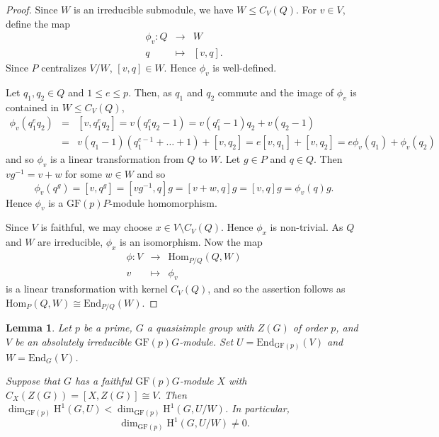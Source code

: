 \documentclass[12pt]{amsart}
\newtheorem{lemma}[theorem]{Lemma}
\theoremstyle{remark}
\theoremstyle{notation}
\theoremstyle{definition}
\newcommand{\GF}{\mathrm{GF}}
\newcommand{\0}{\emptyset}
\begin{document}
\begin{proof} Since $W$ is an irreducible submodule, we   have $W \le C_V(Q)$.
 For $v \in V$, define the map \begin{eqnarray*}\phi_{ v}:Q &\rightarrow& W\\ q &\mapsto& [v,q].\end{eqnarray*}  Since   $P$ centralizes $V/W$, $[v,q]\in W$. Hence $\phi_{ v}$  is well-defined.

Let $q_1,q_2\in Q$ and $1\le e\le p$.  Then, as $q_1$ and $q_2$ commute and the image of $\phi_{  v }$ is contained in $W\le C_V(Q)$,  \begin{eqnarray*}\phi_v(q_1^eq_2)&=&[v,q_1^eq_2]= v(q_1^eq_2-1)= v(q_1^e-1)q_2 +v(q_2-1)\\&=&  v(q_1-1)(q_1^{e-1}+\dots+1)+[v,q_2]= e[v,q_1]+[v,q_2]= e\phi_v(q_1) +\phi_v(q_2) \end{eqnarray*} and so $\phi_{ v}$ is a linear transformation from $Q$ to $W$. Let $g\in P$ and $q \in Q$.  Then $  {v}g^{-1}=   v+w$ for some $w\in W$ and so $$\phi_{  v}(q^g)=[v,q^g] = [vg^{-1},q]g= [v+w,q]g=[v,q]g=\phi_v(q)g.$$ Hence $\phi_{  v}$ is a $\GF(p)P$-module homomorphism.

Since $V$ is faithful, we may choose $x \in V \setminus C_V(Q)$. Hence $\phi_x$ is non-trivial. As $Q$ and $W$ are irreducible,   $\phi_{  x}$ is an isomorphism. Now the map \begin{eqnarray*}
 \phi:   V &\rightarrow& \mathrm{Hom}_{P/Q}(Q,W)\\   v &\mapsto& \phi_{  v}\end{eqnarray*} is a linear transformation with kernel $C_V(Q)$, and so the assertion follows as  $\mathrm{Hom}_P(Q,W)\cong \mathrm{End}_{P/Q}(W)$.
\end{proof}
 







\begin{lemma}\label{lem:some cohomology}
Let  $p$ be a prime, $G$ a quasisimple group with $Z(G)$ of order $p$, and $V$ be  an absolutely irreducible $\GF(p)G$-module.  Set $U= \mathrm{End}_{\GF(p)}(V)$ and $W= \mathrm{End}_G(V)$.

Suppose that $G$ has a faithful $\GF(p)G$-module $X$ with $C_X(Z(G))= [X,Z(G)] \cong V.$
Then $\dim_{\GF(p)} \mathrm H^1(G,U) <  \dim_{\GF(p)} \mathrm H^1(G,U/W)$. In particular, $$\dim_{\GF(p)} \mathrm H^1(G,U/W)\ne 0.$$
\end{lemma}
\end{document}
